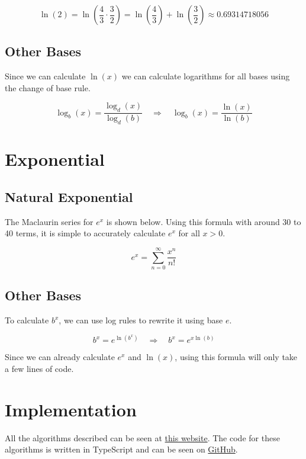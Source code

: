 \documentclass[12pt, letterpaper]{article}
\begin{document}
\[ \ln(2) = \ln\left(\frac{4}{3} \cdot \frac{3}{2}\right) = \ln\left(\frac{4}{3}\right) + \ln\left(\frac{3}{2}\right) \approx 0.69314718056 \]

\subsection{Other Bases}
Since we can calculate $\ln(x)$ we can calculate logarithms for all bases using the change of base rule.

\[ \log_b(x) = \frac{\log_d(x)}{\log_d(b)} \quad \Rightarrow \quad \log_b(x) = \frac{\ln(x)}{\ln(b)} \]

\section{Exponential}
\subsection{Natural Exponential}
The Maclaurin series for $e^x$ is shown below. Using this formula with around 30 to 40 terms, it is simple to accurately calculate $e^x$ for all $x>0$.

\[ e^x = \sum_{n=0}^{\infty}\frac{x^n}{n!} \]

\subsection{Other Bases}

To calculate $b^x$, we can use log rules to rewrite it using base $e$.

\[ b^x = e^{\ln(b^x)} \quad \Rightarrow \quad b^x = e^{x\ln(b)} \]

Since we can already calculate $e^x$ and $\ln(x)$, using this formula will only take a few lines of code.

\section{Implementation}

All the algorithms described can be seen at \href{http://cherry.thomasdev.xyz}{this website}. The code for these algorithms is written in TypeScript and can be seen on \href{https://github.com/mthomas24/cherry-calculator/blob/main/src/calculations.ts}{GitHub}.
\end{document}
